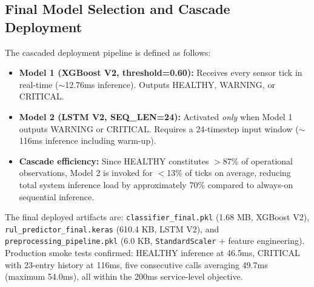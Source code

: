 \documentclass[conference]{IEEEtran}
\begin{document}

\subsection{Final Model Selection and Cascade Deployment}

The cascaded deployment pipeline is defined as follows:
\begin{itemize}
\item \textbf{Model 1 (XGBoost V2, threshold=0.60):} Receives every sensor tick in real-time ($\sim$12.76ms inference). Outputs HEALTHY, WARNING, or CRITICAL.
\item \textbf{Model 2 (LSTM V2, SEQ\_LEN=24):} Activated \textit{only} when Model 1 outputs WARNING or CRITICAL. Requires a 24-timestep input window ($\sim$116ms inference including warm-up).
\item \textbf{Cascade efficiency:} Since HEALTHY constitutes $>$87\% of operational observations, Model 2 is invoked for $<$13\% of ticks on average, reducing total system inference load by approximately 70\% compared to always-on sequential inference.
\end{itemize}

The final deployed artifacts are: \texttt{classifier\_final.pkl} (1.68 MB, XGBoost V2), \texttt{rul\_predictor\_final.keras} (610.4 KB, LSTM V2), and \texttt{preprocessing\_pipeline.pkl} (6.0 KB, \texttt{StandardScaler} + feature engineering). Production smoke tests confirmed: HEALTHY inference at 46.5ms, CRITICAL with 23-entry history at 116ms, five consecutive calls averaging 49.7ms (maximum 54.0ms), all within the 200ms service-level objective.
\end{document}
